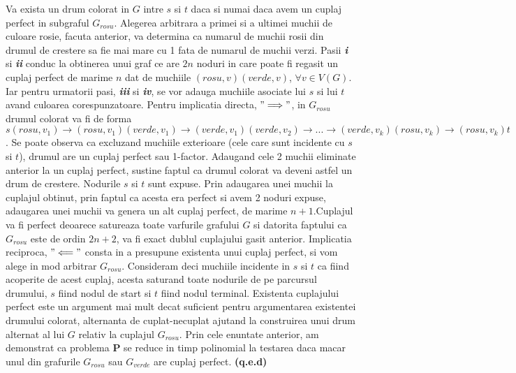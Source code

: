 \documentclass{article}
\begin{document}
\newline
\newline
Va exista un drum colorat in $G$ intre $s$ si $t$ daca si numai daca avem un cuplaj perfect in subgraful $G_{rosu}$. Alegerea arbitrara a primei si a ultimei muchii de culoare rosie, facuta anterior, va determina ca numarul de muchii rosii din drumul de crestere sa fie mai mare cu 1  fata de numarul de muchii verzi.
\newline
\newline
Pasii \textbf{\textit{i}} si \textbf{\textit{ii}} conduc la obtinerea unui graf ce are $2n$ noduri in care poate fi regasit un cuplaj perfect de marime $n$ dat de muchiile $(rosu,v)(verde,v)$, $\forall v \in V(G)$. Iar pentru urmatorii pasi,  \textbf{\textit{iii}} si \textbf{\textit{iv}}, se vor adauga muchiile asociate lui $s$ si lui $t$ avand culoarea corespunzatoare. 
\newline
\newline
Pentru implicatia directa, \textbf{$"\Longrightarrow"$}, in $G_{rosu}$ drumul colorat va fi de forma $s(rosu, v_1)\longrightarrow(rosu, v_1)(verde,v_1)\longrightarrow(verde, v_1)(verde,v_2)\longrightarrow...\longrightarrow(verde,v_k)(rosu, v_k)\longrightarrow(rosu, v_k)t$.  Se poate observa ca excluzand muchiile exterioare (cele care sunt incidente cu $s$ si $t$), drumul are un cuplaj perfect sau 1-factor. Adaugand cele 2 muchii eliminate anterior la un cuplaj perfect, sustine faptul ca drumul colorat va deveni astfel un drum de crestere. Nodurile $s$ si $t$ sunt expuse. Prin adaugarea unei muchii la cuplajul obtinut, prin faptul ca acesta era perfect si avem 2 noduri expuse, adaugarea unei muchii va genera un alt cuplaj perfect, de marime $n+1$.Cuplajul va fi perfect deoarece satureaza toate varfurile grafului $G$ si datorita faptului ca $G_{rosu}$ este de ordin $2n+2$, va fi exact dublul cuplajului gasit anterior.
\newline
\newline
Implicatia reciproca, \textbf{$"\Longleftarrow"$} consta in a presupune existenta unui cuplaj perfect, si vom alege in mod arbitrar $G_{rosu}$. Consideram deci muchiile incidente in $s$ si $t$ ca fiind acoperite de acest cuplaj, acesta saturand toate nodurile de pe parcursul drumului, $s$ fiind nodul de start si $t$ fiind nodul terminal. Existenta cuplajului perfect este un argument mai mult decat suficient pentru argumentarea existentei drumului colorat, alternanta de cuplat-necuplat ajutand la construirea unui drum alternat al lui $G$ relativ la cuplajul $G_{rosu}$.
\newline
\newline
Prin cele enuntate anterior, am demonstrat ca problema \textbf{P} se reduce in timp polinomial la testarea daca macar unul din grafurile $G_{rosu}$ sau $G_{verde}$ are cuplaj perfect. \textbf{(q.e.d)}
\end{document}
